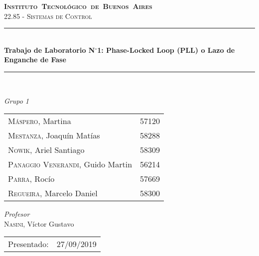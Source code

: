 \begin{titlepage}
\newcommand{\HRule}{\rule{\linewidth}{0.5mm}}
\center
\mbox{\textsc{\LARGE \bfseries {Instituto Tecnol\'ogico de Buenos Aires}}}\\[1.5cm]
\textsc{\Large 22.85 - Sistemas de Control}\\[0.5cm]


\HRule \\[0.6cm]
{ \Huge \bfseries Trabajo de Laboratorio N$^{\circ}$1: Phase-Locked Loop (PLL) o Lazo de Enganche de Fase}\\[0.4cm] %
\HRule \\[1.5cm]


{\large

\emph{Grupo 1}\\
\vspace{3px}

\begin{tabular}{lr} 	
\textsc{M\'aspero}, Martina  & 57120 \\
\textsc{Mestanza}, Joaqu\'in Mat\'ias  & 58288 \\
\textsc{Nowik}, Ariel Santiago  & 58309 \\
\textsc{Panaggio Venerandi}, Guido Martin  & 56214 \\
\textsc{Parra}, Roc\'io  & 57669 \\
\textsc{Regueira}, Marcelo Daniel  & 58300 \\

\end{tabular}

\vspace{20px}

\emph{Profesor}\\
\vspace{3px}
\textsc{Nasini}, V\'ictor Gustavo\\ 	
\vspace{100px}

\begin{tabular}{ll}

Presentado: & 27/09/2019\\

\end{tabular}

}

\vfill

\end{titlepage}